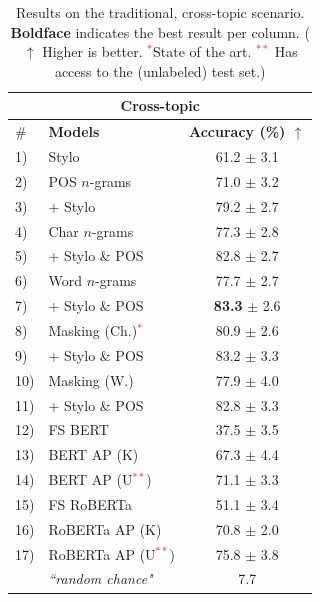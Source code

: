 \documentclass[11pt]{article}
\begin{document}
\begin{table}[htb]
\caption{\label{tbl:Xtopic}Results on the traditional, cross-topic scenario. \textbf{Boldface} indicates the best result per column. ($\uparrow$ Higher is better. \textcolor{red}{$^{*}$}State of the art. \textcolor{red}{$^{**}$} Has access to the (unlabeled) test set.)}
\centering
\begin{tabular}{l|l|c }
\hline
\multicolumn{3}{c}{\textbf{Cross-topic}}    \\\hline
\# & \textbf{Models} & \textbf{Accuracy (\%) $\uparrow$ } \\\hline
1) & Stylo                & 61.2 $\pm$ 3.1\\\hline

2) & POS $n$-grams   & 71.0 $\pm$ 3.2\\
3) & \phantom{hi}+ Stylo         & 79.2 $\pm$ 2.7\\\hline

4) & Char $n$-grams   & 77.3 $\pm$ 2.8\\
5) & \phantom{hi}+ Stylo \& POS   & 82.8 $\pm$ 2.7\\\hline

6) & Word $n$-grams   & 77.7 $\pm$ 2.7\\
7) & \phantom{hi}+ Stylo \& POS    & \textbf{83.3} $\pm$ 2.6\\\hline

8) & Masking (Ch.)\textcolor{red}{$^{*}$}      & 80.9 $\pm$ 2.6\\
9) & \phantom{hi}+ Stylo \& POS  & 83.2  $\pm$ 3.3\\\hline

10) & Masking (W.)    & 77.9 $\pm$ 4.0\\
11) & \phantom{hi}+ Stylo \& POS    & 82.8 $\pm$ 3.3\\
\hline
12) & FS BERT  & 37.5 $\pm$ 3.5\\
13) & BERT AP (K) & 67.3 $\pm$ 4.4\\
14) & BERT AP (U\textcolor{red}{$^{**}$}) & 71.1 $\pm$ 3.3\\
\hline
15) & FS RoBERTa  & 51.1 $\pm$ 3.4\\
16) & RoBERTa AP (K) & 70.8 $\pm$ 2.0\\
17) & RoBERTa AP (U\textcolor{red}{$^{**}$}) & 75.8 $\pm$ 3.8\\
\hline
\hline
& \multirow{1}{*}{\textit{``random chance"}}   & 7.7 \\\hline
\end{tabular}
\end{table}
\end{document}
